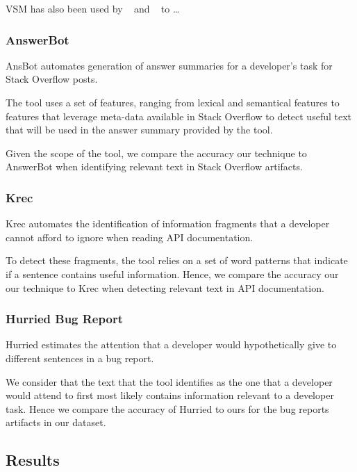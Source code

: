 VSM has also been used by ~\cite{Lin2021} and ~\cite{Ye2016} to \dots





\subsubsection{AnswerBot}


\acf{AnsBot} automates generation of answer summaries for a developer's task for Stack Overflow posts.

The tool uses a set of features, ranging from lexical and semantical features to features that leverage meta-data available in Stack Overflow to detect useful text that will be used in the answer summary provided by the tool. 

Given the scope of the tool, we compare the accuracy our technique to AnswerBot when identifying relevant text in 
Stack Overflow artifacts.


\subsubsection{Krec}


\acf{Krec} automates the identification of information fragments that a developer cannot afford to ignore when reading API documentation.

To detect these fragments, the tool relies on a set of word patterns that indicate if a sentence contains useful information. Hence, we compare the accuracy our our technique to Krec when detecting relevant text in API documentation.


\subsubsection{Hurried Bug Report}


\acf{Hurried} estimates the attention that a developer would hypothetically give to different sentences in a bug report. 


We consider that the text that the tool identifies as the one that a developer would attend to first most likely contains information relevant to a developer task. Hence we compare the accuracy of \acf{Hurried} to ours for the bug reports artifacts in our dataset.


\subsection{Results}




% 


% 


% 



